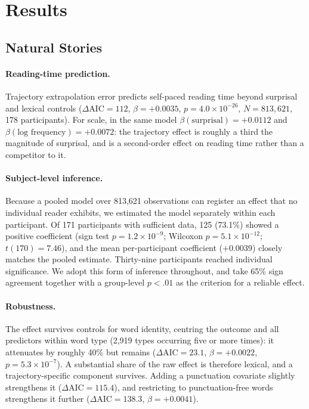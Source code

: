 \documentclass[12pt]{article}
\newcommand{\new}[1]{{\bfseries #1}}
\begin{document}
\section{Results}

\subsection{Natural Stories}

\new{\paragraph{Reading-time prediction.} Trajectory extrapolation error predicts self-paced reading time beyond surprisal and lexical controls ($\Delta\text{AIC} = 112$, $\beta = +0.0035$, $p = 4.0 \times 10^{-26}$, $N = 813{,}621$, 178 participants). For scale, in the same model $\beta(\text{surprisal}) = +0.0112$ and $\beta(\text{log frequency}) = +0.0072$: the trajectory effect is roughly a third the magnitude of surprisal, and is a second-order effect on reading time rather than a competitor to it.}

\new{\paragraph{Subject-level inference.} Because a pooled model over 813,621 observations can register an effect that no individual reader exhibits, we estimated the model separately within each participant. Of 171 participants with sufficient data, 125 (73.1\%) showed a positive coefficient (sign test $p = 1.2 \times 10^{-9}$; Wilcoxon $p = 5.1 \times 10^{-12}$; $t(170) = 7.46$), and the mean per-participant coefficient ($+0.0039$) closely matches the pooled estimate. Thirty-nine participants reached individual significance. We adopt this form of inference throughout, and take 65\% sign agreement together with a group-level $p < .01$ as the criterion for a reliable effect.}

\new{\paragraph{Robustness.} The effect survives controls for word identity, centring the outcome and all predictors within word type (2,919 types occurring five or more times): it attenuates by roughly 40\% but remains ($\Delta\text{AIC} = 23.1$, $\beta = +0.0022$, $p = 5.3 \times 10^{-7}$). A substantial share of the raw effect is therefore lexical, and a trajectory-specific component survives. Adding a punctuation covariate slightly strengthens it ($\Delta\text{AIC} = 115.4$), and restricting to punctuation-free words strengthens it further ($\Delta\text{AIC} = 138.3$, $\beta = +0.0041$).}
\end{document}
